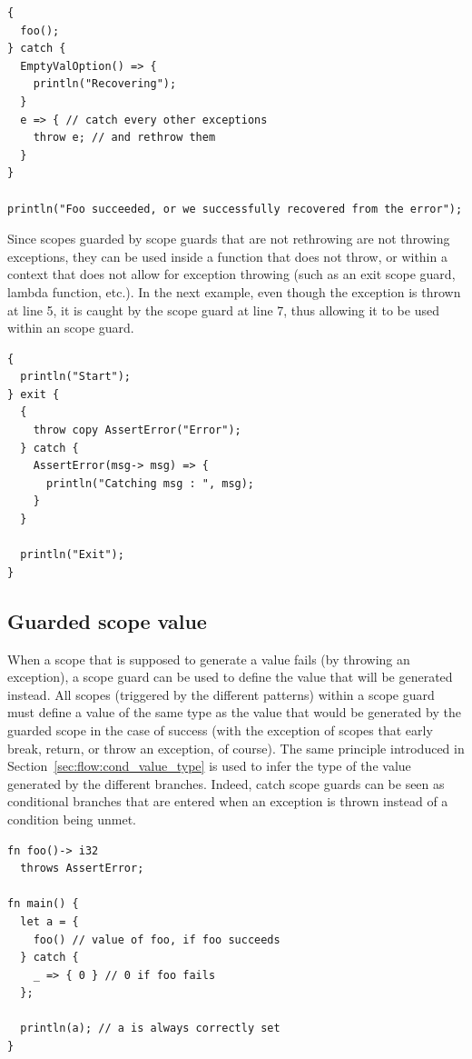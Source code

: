 \begin{lstlisting}[style=coloredverbatim]
{
  foo();
} catch {
  EmptyValOption() => {
    println("Recovering");
  }
  e => { // catch every other exceptions
    throw e; // and rethrow them
  }
}

println("Foo succeeded, or we successfully recovered from the error");
\end{lstlisting}

Since scopes guarded by  scope guards that are not rethrowing are
not throwing exceptions, they can be used inside a function that does not throw,
or within a context that does not allow for exception throwing (such as an exit
scope guard, lambda function, etc.). In the next example, even though the
exception  is thrown at line 5, it is caught by the scope
guard at line 7, thus allowing it to be used within an  scope guard.

\begin{lstlisting}[style=coloredverbatim]
{
  println("Start");
} exit {
  {
    throw copy AssertError("Error");
  } catch {
    AssertError(msg-> msg) => {
      println("Catching msg : ", msg);
    }
  }

  println("Exit");
}
\end{lstlisting}

\subsection{Guarded scope value}

When a scope that is supposed to generate a value fails (by throwing an
exception), a  scope guard can be used to define the value that
will be generated instead. All scopes (triggered by the different patterns)
within a  scope guard must define a value of the same type as the
value that would be generated by the guarded scope in the case of success (with
the exception of scopes that early break, return, or throw an exception, of
course). The same principle introduced in Section~\ref{sec:flow:cond_value_type} is
used to infer the type of the value generated by the different branches. Indeed,
catch scope guards can be seen as  conditional branches that are
entered when an exception is thrown instead of a condition being unmet.

\begin{lstlisting}[style=coloredverbatim]
fn foo()-> i32
  throws AssertError;

fn main() {
  let a = {
    foo() // value of foo, if foo succeeds
  } catch {
    _ => { 0 } // 0 if foo fails
  };

  println(a); // a is always correctly set
}
\end{lstlisting}


